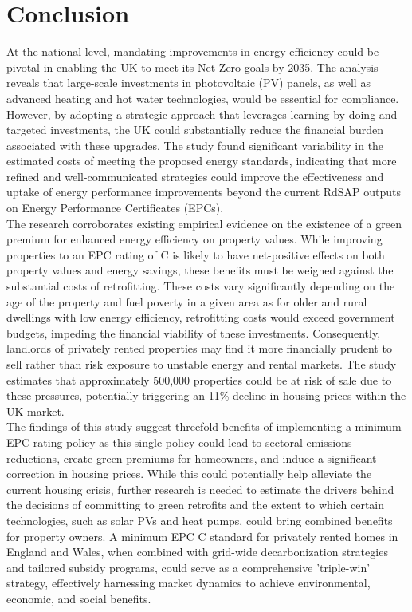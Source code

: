 \section{Conclusion}

At the national level, mandating improvements in energy efficiency could be pivotal in enabling the UK to meet its Net Zero goals by 2035. The analysis reveals that large-scale investments in photovoltaic (PV) panels, as well as advanced heating and hot water technologies, would be essential for compliance. However, by adopting a strategic approach that leverages learning-by-doing and targeted investments, the UK could substantially reduce the financial burden associated with these upgrades. The study found significant variability in the estimated costs of meeting the proposed energy standards, indicating that more refined and well-communicated strategies could improve the effectiveness and uptake of energy performance improvements beyond the current RdSAP outputs on Energy Performance Certificates (EPCs). \\


The research corroborates existing empirical evidence on the existence of a green premium for enhanced energy efficiency on property values. While improving properties to an EPC rating of C is likely to have net-positive effects on both property values and energy savings, these benefits must be weighed against the substantial costs of retrofitting. These costs vary significantly depending on the age of the property and fuel poverty in a given area as for older and rural dwellings with low energy efficiency, retrofitting costs would exceed government budgets, impeding the financial viability of these investments. Consequently, landlords of privately rented properties may find it more financially prudent to sell rather than risk exposure to unstable energy and rental markets. The study estimates that approximately 500,000 properties could be at risk of sale due to these pressures, potentially triggering an 11\% decline in housing prices within the UK market. \\

The findings of this study suggest threefold benefits of implementing a minimum EPC rating policy as this single policy could lead to sectoral emissions reductions, create green premiums for homeowners, and induce a significant correction in housing prices. While this could potentially help alleviate the current housing crisis, further research is needed to estimate the drivers behind the decisions of committing to green retrofits and the extent to which certain technologies, such as solar PVs and heat pumps, could bring combined benefits for property owners. A minimum EPC C standard for privately rented homes in England and Wales, when combined with grid-wide decarbonization strategies and tailored subsidy programs, could serve as a comprehensive 'triple-win' strategy, effectively harnessing market dynamics to achieve environmental, economic, and social benefits.
